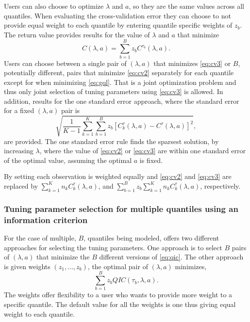 Users can also choose to optimize \(\lambda\) and \(a\), so they are the same values across all quantiles. When evaluating the cross-validation error they can choose to not provide equal weight to each quantile by entering quantile specific weights of \(z_b\). The return value  provides results for the value of \(\lambda\) and \(a\) that minimize
\begin{equation}
C(\lambda,a) = \sum_{b=1}^B z_b C^{\tau_b}(\lambda,a).
\label{eq:cv3}
\end{equation}
Users can choose between a single pair of \((\lambda,a)\) that minimizes \eqref{eq:cv3} or \(B\), potentially different, pairs that minimize \eqref{eq:cv2} separately for each quantile except for when minimizing \eqref{eq:gql}. That is a joint optimization problem and thus only joint selection of tuning parameters using \eqref{eq:cv3} is allowed. In addition, results for the one standard error approach, where the standard error for a fixed \((\lambda,a)\) pair is
\begin{equation}
\sqrt{\frac{1}{K-1}\sum_{k=1}^K \sum_{b=1}^B z_b \left[C_k^\tau(\lambda,a) -C^\tau(\lambda,a) \right]^2},
\end{equation}
are provided. The one standard error rule finds the sparsest solution, by increasing \(\lambda\), where the value of \eqref{eq:cv2} or \eqref{eq:cv3} are within one standard error of the optimal value, assuming the optimal \(a\) is fixed.

By setting  each observation is weighted equally and \eqref{eq:cv2} and \eqref{eq:cv3} are replaced by \(\sum_{k=1}^K n_k C_k^\tau(\lambda,a)\),
and \(\sum_{b=1}^B z_b \sum_{k=1}^K n_k C_k^\tau(\lambda,a)\), respectively.

\subsubsection{Tuning parameter selection for multiple quantiles using an information criterion}\label{tuning-parameter-selection-for-multiple-quantiles-using-an-information-criterion}

For the case of multiple, \(B\), quantiles being modeled,  offers two different approaches for selecting the tuning parameters. One approach is to select \(B\) pairs of \((\lambda,a)\) that minimize the \(B\) different versions of \eqref{eq:qic}. The other approach is given weights \((z_1,\ldots,z_b)\), the optimal pair of \((\lambda,a)\) minimizes,
\begin{equation}
\sum_{b=1}^B z_b QIC(\tau_b,\lambda,a).
\label{eq:jointQic}
\end{equation}
The weights offer flexibility to a user who wants to provide more weight to a specific quantile. The default value for all the weights is one thus giving equal weight to each quantile.

